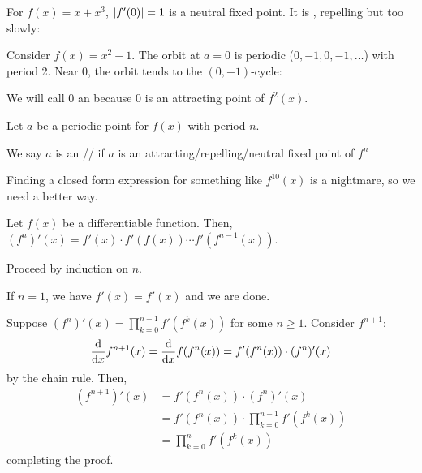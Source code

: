 \documentclass[class=pmath370,tikz,notes]{agony}
\begin{document}
\begin{example}
  For $f(x) = x + x^3$, $\abs{f'(0)} = 1$ is a neutral fixed point.
  It is ,
  repelling but too slowly:
  \begin{center}
    \quad
  \end{center}
\end{example}

\begin{example}
  Consider $f(x) = x^2 - 1$.
  The orbit at $a = 0$ is periodic ($0,-1,0,-1,\dots$) with period 2.
  Near 0, the orbit tends to the $(0,-1)$-cycle:
  \begin{center}
  \end{center}
  We will call 0 an 
  because 0 is an attracting point of $f^2(x)$.
\end{example}



\begin{defn}
  Let $a$ be a periodic point for $f(x)$ with period $n$.

  We say $a$ is an //
  if $a$ is an attracting/repelling/neutral fixed point of $f^n$
\end{defn}

Finding a closed form expression for something like $f^{10}(x)$
is a nightmare, so we need a better way.

\begin{prop}\label{prop:dv}
  Let $f(x)$ be a differentiable function.
  Then, $(f^n)'(x) = f'(x)\cdot f'(f(x))\dotsb f'(f^{n-1}(x))$.
\end{prop}
\begin{prf}
  Proceed by induction on $n$.

  If $n=1$, we have $f'(x) = f'(x)$ and we are done.

  Suppose $(f^n)'(x) = \prod_{k=0}^{n-1} f'(f^k(x))$ for some $n \geq 1$.
  Consider $f^{n+1}$:
  \begin{align*}
    \dv{x} f^{n+1}(x) = \dv{x} f(f^n(x)) = f'(f^n(x))\cdot(f^n)'(x)
  \end{align*}
  by the chain rule. Then,
  \begin{align*}
    (f^{n+1})'(x)
     & = f'(f^n(x))\cdot(f^n)'(x)                    \\
     & = f'(f^n(x))\cdot\prod_{k=0}^{n-1} f'(f^k(x)) \\
     & = \prod_{k=0}^{n} f'(f^k(x))
  \end{align*}
  completing the proof.
\end{prf}
\end{document}
